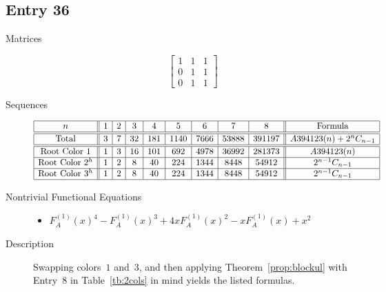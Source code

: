 \documentclass[12pt]{amsart}
\newcommand{\gff}[2]{F_{#2}^{(#1)}(x)}
\newcommand{\gfa}[1]{\gff{#1}{A}}
\begin{document}
\subsection*{Entry 36}
\begin{description}
    \item[Matrices]
    
    \[\begin{bmatrix}
1 & 1 & 1 \\
0 & 1 & 1 \\
0 & 1 & 1
\end{bmatrix}\]
    \item[Sequences]\hspace*{\fill}\vspace{-0.5cm}
    \begin{center}
        \[
        \begin{array}{|c||c|c|c|c|c|c|c|c||c|}\hline
           n  & 1 & 2 & 3 & 4 & 5 & 6 & 7 & 8  & \text{Formula}\\\hline\hline
           \text{Total}  & 3 & 7 & 32 & 181 & 1140 & 7666 & 53888 & 391197 & A394123(n)+2^nC_{n-1}\\\hline\hline
           \text{Root Color }1 & 1 & 3 & 16 & 101 & 692 & 4978 & 36992 & 281373 & A394123(n)\\\hline
           \text{Root Color }2^{h} & 1 & 2 & 8 & 40 & 224 & 1344 & 8448 & 54912 & 2^{n-1}C_{n-1}\\\hline
           \text{Root Color }3^{h} & 1 & 2 & 8 & 40 & 224 & 1344 & 8448 & 54912 & 2^{n-1}C_{n-1}\\\hline
        \end{array}
        \]
    \end{center}
    
    \item[Nontrivial Functional Equations]\hspace*{\fill}

    \begin{itemize}
\item $\gfa{1}^4-\gfa{1}^3+4x\gfa{1}^2-x\gfa{1}+x^2$


\end{itemize}
\item[Description] Swapping colors~$1$ and~$3$, and then applying Theorem~\ref{prop:blockul} with Entry~8 in Table~\ref{tb:2cols} in mind yields the listed formulas.
    
\end{description}
\end{document}
